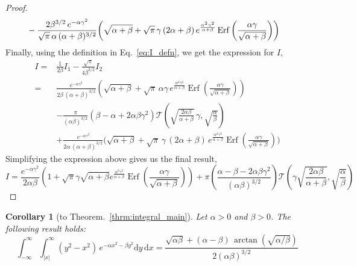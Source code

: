 \documentclass[journal]{IEEEtran}
\theoremstyle{plain}
\newtheorem{corollary}[theorem]{Corollary}
\theoremstyle{definition}
\theoremstyle{remark}
\newcommand{\Ot}{\mathcal{T}}
\newcommand{\Erf}{\operatorname{Erf}}
\newcommand{\dd}{\mathrm{d}}
\begin{document}
\begin{proof}
\begin{equation}
\begin{split}
    &-\frac{2 \beta^{3/2} \, e^{-\alpha  \gamma ^2} }{\sqrt{\pi} \, \alpha \, (\alpha +\beta )^{3/2}} \biggl(\sqrt{\alpha +\beta } +\sqrt{\pi } \,\gamma \, (2 \alpha +\beta ) \, e^{\frac{\alpha ^2 \gamma ^2}{\alpha +\beta }} \Erf\left(\frac{\alpha  \gamma }{\sqrt{\alpha +\beta }}\right)\biggr) 
\end{split}
\raisetag{30pt}
\end{equation}
Finally, using the definition in Eq.~\eqref{eq:I_defn}, we get the expression for $I$,
\begin{equation}
\begin{split}
    I =&  \frac{1}{2\beta} I_1 - \frac{\sqrt{\pi}}{4\beta^{3/2}} I_2 \\
    =& \frac{e^{-\alpha  \gamma ^2}}{2 \beta \, (\alpha +\beta )^{3/2}} \left(\sqrt{\alpha +\beta } + \sqrt{\pi } \, \alpha  \gamma \, e^{\frac{\alpha ^2 \gamma ^2}{\alpha +\beta }} \Erf \left(\frac{\alpha  \gamma }{\sqrt{\alpha +\beta }}\right)\right) \\&- \frac{\pi}{(\alpha\beta)^{3/2}}  \left(\beta - \alpha  + 2 \alpha\beta \gamma ^2 \right) \Ot\left(\sqrt{\frac{2 \alpha \beta}{\alpha + \beta}} \, \gamma, \sqrt{\frac{\alpha}{\beta}}\right) \\
    &+ \frac{ \, e^{-\alpha  \gamma ^2} }{2 \alpha \, (\alpha +\beta )^{3/2}} \biggl(\sqrt{\alpha +\beta } +\sqrt{\pi } \,\gamma \, (2 \alpha +\beta ) \, e^{\frac{\alpha ^2 \gamma ^2}{\alpha +\beta }} \Erf\left(\frac{\alpha  \gamma }{\sqrt{\alpha +\beta }}\right)\biggr)
\end{split}
\end{equation}
Simplifying the expression above gives us the final result,
\begin{equation}
    I = \frac{e^{-\alpha \gamma^2}}{2\alpha\beta} \left(1 + \sqrt{\pi}  \gamma \sqrt{\alpha + \beta}   e^{\frac{\alpha^2 \gamma^2}{\alpha + \beta}}  \Erf\left(\frac{\alpha \gamma}{\sqrt{\alpha + \beta}}\right)\right) + \pi \left(\frac{\alpha - \beta - 2\alpha\beta\gamma^2}{(\alpha\beta)^{3/2}}\right) \Ot\left(\gamma\sqrt{\frac{2\alpha\beta}{\alpha+\beta}}, \sqrt{\frac{\alpha}{\beta}}\right)
\end{equation}

\end{proof}


\begin{corollary}[to Theorem.~\ref{thrm:integral_main}]
Let $\alpha > 0$ and $\beta > 0$. The following result holds:
\begin{equation}
 \int_{-\infty}^\infty \int_{|x|}^\infty (y^2-x^2)\, e^{-\alpha x^2-\beta y^2} \dd y \, \dd x = \frac{\sqrt{\alpha\beta} + \left(\alpha - \beta\right) \, \arctan\left( \sqrt{\alpha/\beta} \right) }{2 (\alpha\beta)^{3/2}} 
\end{equation}
\end{corollary}
\end{document}
